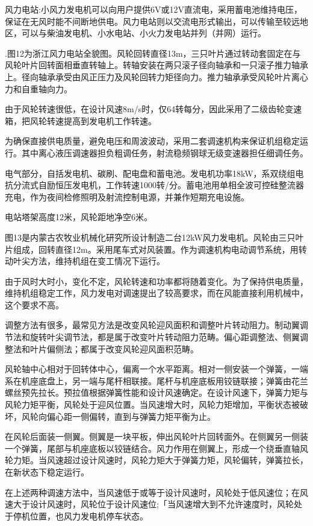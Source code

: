 \documentclass{ctexbook}
\begin{document}
风力电站:小风力发电机可以向用户提供6V或12V直流电，采用蓄电池维持电压，保证在无风时能不间断地供电。风力电站则以交流电形式输出，可以传输至较远地区，可以与柴油发电机、小水电站、小火力发电站并列（并网）运行。

.图12为浙江风力电站全貌图。风轮回转直径13m，三只叶片通过转动套固定在与风轮叶片回转面相垂直转轴上。转轴安装在两只滚子径向轴承和一只滚子推力轴承上。径向轴承承受由风正压力及风轮回转力矩径向力。推力轴承承受风轮叶片离心力和自重轴向力。

由于风轮转速很低，在设计风速8m/s时，仅64转每分，因此采用了二级齿轮变速箱，把风轮转速提高到发电机工作转速。

为确保直接供电质量，避免电压和周波波动，采用二套调速机构来保证机组稳定运行。其中离心液压调速器担负粗调任务，射流稳频钢球无级变速器担任细调任务。

电气部分，自括发电机、碳刷、配电盘和蓄电池。发电机功率18kW，系双绕组电抗分流式自励恒压发电机，工作转速1000转/分。蓄电池用单相全波可控硅整流器充电，作为夜间检修照明及射流控制电源，并兼作短期充电设施。

电站塔架高度12米，风轮距地净空6米。

图13是内蒙古农牧业机械化研究所设计制造二台12kW风力发电机。风轮由三只叶片组成，回转直径12m。采用尾车式对风装置。作为调速机构电动调节系统，用转动叶尖方法，维持机组在变工情况下运行。

由于风时大时小，变化不定，风轮转速和功率都将随着变化。为了保持供电质量，维持机组稳定工作，风力发电对调速提出了较高要求，而在风能直接利用机械中，这个要求不高。

调整方法有很多，最常见方法是改变风轮迎风面积和调整叶片转动阻力。制动翼调节法和旋转叶尖调节法，都是属于改变叶片转动阻力范畴。偏心距调整法、侧翼调整法和叶片偏侧法；都属于改变风轮迎风面积范畴。

风轮轴中心相对于回转体中心，偏离一个水平距离。相对一侧安装一个弹簧，一端系在机座底盘上，另一端与尾杆相联接。尾杆与机座底板用铰链联接；弹簧由花兰螺丝预先拉长。预拉值根据弹簧性能和设计风速确定。在设计风速下，弹簧力矩与风轮力矩平衡，风轮处于迎风位置。当风速增大时，风轮力矩增加，平衡状态被破坏，风轮向偏心距一侧偏转，直到与弹簧力矩平衡为止。

在风轮后面装一侧翼。侧翼是一块平板，伸出风轮叶片回转面外。在侧翼另一侧装一个弹簧，尾部与机座底板以铰链结合。风力作用在侧翼上，形成一个绕垂直轴风轮力矩。当风速超过设计风速时，风轮力矩大于弹簧力矩，风轮偏转，弹簧拉长，在新状态下稳定运行。
	
在上述两种调速方法中，当风速低于或等于设计风速时，风轮处于低风速位；在风速大于设计风速时，风轮位于设计风速位;「当风速增大到不允许速度时，风轮处于停机位置，也风力发电机停车状态。
\end{document}
